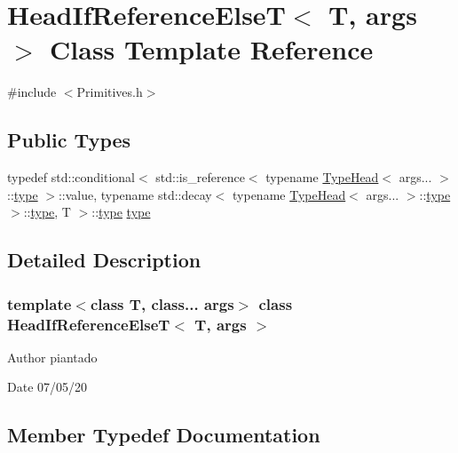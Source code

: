 \hypertarget{struct_head_if_reference_else_t}{}\section{Head\+If\+Reference\+ElseT$<$ T, args $>$ Class Template Reference}
\label{struct_head_if_reference_else_t}


{\ttfamily \#include $<$Primitives.\+h$>$}

\subsection*{Public Types}
\begin{DoxyCompactItemize}
\item 
typedef std\+::conditional$<$ std\+::is\+\_\+reference$<$ typename \hyperlink{struct_type_head}{Type\+Head}$<$ args... $>$\+::\hyperlink{struct_head_if_reference_else_t_aa668af542560a9a8541b1ff59f23d51a}{type} $>$\+::value, typename std\+::decay$<$ typename \hyperlink{struct_type_head}{Type\+Head}$<$ args... $>$\+::\hyperlink{struct_head_if_reference_else_t_aa668af542560a9a8541b1ff59f23d51a}{type} $>$\+::\hyperlink{struct_head_if_reference_else_t_aa668af542560a9a8541b1ff59f23d51a}{type}, T $>$\+::\hyperlink{struct_head_if_reference_else_t_aa668af542560a9a8541b1ff59f23d51a}{type} \hyperlink{struct_head_if_reference_else_t_aa668af542560a9a8541b1ff59f23d51a}{type}
\end{DoxyCompactItemize}


\subsection{Detailed Description}
\subsubsection*{template$<$class T, class... args$>$\newline
class Head\+If\+Reference\+Else\+T$<$ T, args $>$}

\begin{DoxyAuthor}{Author}
piantado 
\end{DoxyAuthor}
\begin{DoxyDate}{Date}
07/05/20 
\end{DoxyDate}


\subsection{Member Typedef Documentation}
\mbox{\label{struct_head_if_reference_else_t_aa668af542560a9a8541b1ff59f23d51a}} 
